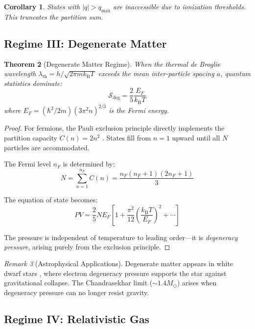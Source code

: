 \documentclass[twocolumn,10pt,a4paper]{article}
\newtheorem{theorem}{Theorem}[section]
\newtheorem{corollary}[theorem]{Corollary}
\theoremstyle{definition}
\theoremstyle{remark}
\newtheorem{remark}[theorem]{Remark}
\newcommand{\kB}{k_{\mathrm{B}}}
\begin{document}
\begin{corollary}
States with $|q| > q_{\max}$ are inaccessible due to ionization thresholds. This truncates the partition sum.
\end{corollary}

\subsection{Regime III: Degenerate Matter}

\begin{theorem}[Degenerate Matter Regime]
When the thermal de Broglie wavelength $\lambda_{\text{th}} = h/\sqrt{2\pi m \kB T}$ exceeds the mean inter-particle spacing $a$, quantum statistics dominate:
\begin{equation}
    \mathcal{S}_{\text{deg}} = \frac{2}{5}\frac{E_F}{\kB T}
\end{equation}
where $E_F = (\hbar^2/2m)(3\pi^2 n)^{2/3}$ is the Fermi energy.
\end{theorem}

\begin{proof}
For fermions, the Pauli exclusion principle directly implements the partition capacity $C(n) = 2n^2$ \cite{fermi1926}. States fill from $n = 1$ upward until all $N$ particles are accommodated.

The Fermi level $n_F$ is determined by:
\begin{equation}
    N = \sum_{n=1}^{n_F} C(n) = \frac{n_F(n_F+1)(2n_F+1)}{3}
\end{equation}

The equation of state becomes:
\begin{equation}
    PV = \frac{2}{5}N E_F \left[1 + \frac{\pi^2}{12}\left(\frac{\kB T}{E_F}\right)^2 + \cdots\right]
\end{equation}

The pressure is independent of temperature to leading order---it is \emph{degeneracy pressure}, arising purely from the exclusion principle.
\end{proof}

\begin{remark}[Astrophysical Applications]
Degenerate matter appears in white dwarf stars \cite{chandrasekhar1931}, where electron degeneracy pressure supports the star against gravitational collapse. The Chandrasekhar limit ($\sim 1.4 M_\odot$) arises when degeneracy pressure can no longer resist gravity.
\end{remark}

\subsection{Regime IV: Relativistic Gas}
\end{document}
